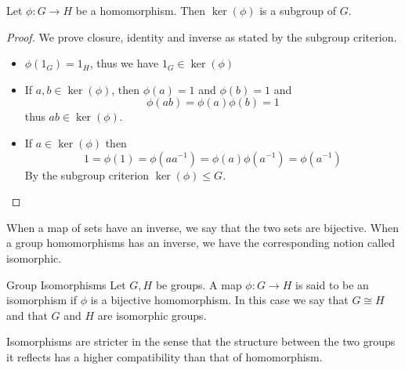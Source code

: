 \documentclass[a4paper]{article}
\begin{document}
\begin{prp}{}{} Let $\phi:G\to H$ be a homomorphism. Then $\ker(\phi)$ is a subgroup of $G$. 
\begin{proof}
We prove closure, identity and inverse as stated by the subgroup criterion. 
\begin{itemize}
\item $\phi(1_G)=1_H$, thus we have $1_G\in\ker(\phi)$
\item If $a,b\in\ker(\phi)$, then $\phi(a)=1$ and $\phi(b)=1$ and $$\phi(ab)=\phi(a)\phi(b)=1$$ thus $ab\in\ker(\phi)$. 
\item If $a\in\ker(\phi)$ then $$1=\phi(1)=\phi(aa^{-1})=\phi(a)\phi(a^{-1})=\phi(a^{-1})$$ By the subgroup criterion $\ker(\phi)\leq G$. 
\end{itemize}
\end{proof}
\end{prp}

When a map of sets have an inverse, we say that the two sets are bijective. When a group homomorphisms has an inverse, we have the corresponding notion called isomorphic. 

\begin{defn}{Group Isomorphisms}{} Let $G,H$ be groups. A map $\phi:G\to H$ is said to be an isomorphism if $\phi$ is a bijective homomorphism. In this case we say that $G\cong H$ and that $G$ and $H$ are isomorphic groups. 
\end{defn}

Isomorphisms are stricter in the sense that the structure between the two groups it reflects has a higher compatibility than that of homomorphism. 
\end{document}
